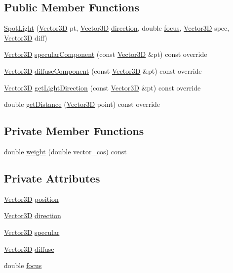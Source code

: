 \subsection*{Public Member Functions}
\begin{DoxyCompactItemize}
\item 
\hyperlink{classSpotLight_a2c1e4da1b0f152f7a46e9a1eff42a008}{Spot\+Light} (\hyperlink{classVector3D}{Vector3D} pt, \hyperlink{classVector3D}{Vector3D} \hyperlink{classSpotLight_a536a59851dfaafa45f15c120295a1d24}{direction}, double \hyperlink{classSpotLight_a0fe5ae38bd4778e16fc2c1587c554a69}{focus}, \hyperlink{classVector3D}{Vector3D} spec, \hyperlink{classVector3D}{Vector3D} diff)
\item 
\hyperlink{classVector3D}{Vector3D} \hyperlink{classSpotLight_a6a1cc6970bbb3308b5214f85641331cd}{specular\+Component} (const \hyperlink{classVector3D}{Vector3D} \&pt) const override
\item 
\hyperlink{classVector3D}{Vector3D} \hyperlink{classSpotLight_a0810e4bd136caddea0c65b819f2bd400}{diffuse\+Component} (const \hyperlink{classVector3D}{Vector3D} \&pt) const override
\item 
\hyperlink{classVector3D}{Vector3D} \hyperlink{classSpotLight_a051e210b637edf37bf2b8d49149a13a4}{get\+Light\+Direction} (const \hyperlink{classVector3D}{Vector3D} \&pt) const override
\item 
double \hyperlink{classSpotLight_a117f7918773e193f67714765c5370418}{get\+Distance} (\hyperlink{classVector3D}{Vector3D} point) const override
\end{DoxyCompactItemize}
\subsection*{Private Member Functions}
\begin{DoxyCompactItemize}
\item 
double \hyperlink{classSpotLight_a2cbede9e816bc29375fe06d5c2f972c4}{weight} (double vector\+\_\+cos) const 
\end{DoxyCompactItemize}
\subsection*{Private Attributes}
\begin{DoxyCompactItemize}
\item 
\hyperlink{classVector3D}{Vector3D} \hyperlink{classSpotLight_aca124556510f5fd4d44660174f077cd7}{position}
\item 
\hyperlink{classVector3D}{Vector3D} \hyperlink{classSpotLight_a536a59851dfaafa45f15c120295a1d24}{direction}
\item 
\hyperlink{classVector3D}{Vector3D} \hyperlink{classSpotLight_a21623e0e4a294ddb7068ee618dfab1d6}{specular}
\item 
\hyperlink{classVector3D}{Vector3D} \hyperlink{classSpotLight_aad9742cfa7d1c049ad051bc87a996e04}{diffuse}
\item 
double \hyperlink{classSpotLight_a0fe5ae38bd4778e16fc2c1587c554a69}{focus}
\end{DoxyCompactItemize}


